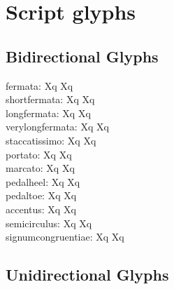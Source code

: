 \documentclass{scrartcl}
\begin{document}
\section*{Script glyphs}

\subsection*{Bidirectional Glyphs}

fermata:  Xq  Xq\\
shortfermata:  Xq  Xq\\
longfermata:  Xq  Xq\\
verylongfermata:  Xq  Xq\\
staccatissimo:  Xq  Xq\\
portato:  Xq  Xq\\
marcato:  Xq  Xq\\
pedalheel:  Xq  Xq\\
pedaltoe:  Xq  Xq\\
accentus:  Xq  Xq\\
semicirculus:  Xq  Xq\\
signumcongruentiae:  Xq  Xq\\

\subsection*{Unidirectional Glyphs}
\end{document}
